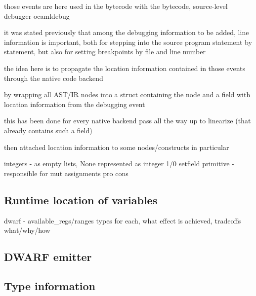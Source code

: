those events are here used in the bytecode with the bytecode, source-level debugger ocamldebug

it was stated previously that among the debugging information to be added, line
information is important, both for stepping into the source program statement by
statement, but also for setting breakpoints by file and line number

the idea here is to propagate the location information contained in those events
through the native code backend

by wrapping all AST/IR nodes into a struct containing the node and a field with
location information from the debugging event

this has been done for every native backend pass all the way up to linearize (that already
contains such a field)

then attached location information to some nodes/constructs in particular

integers - as empty lists, None represented as integer 1/0
setfield primitive - responsible for mut assignments
pro cons

\subsection{Runtime location of variables}

dwarf - available\_regs/ranges
types
for each, what effect is achieved, tradeoffs
what/why/how

\subsection{DWARF emitter}

\subsection{Type information}




